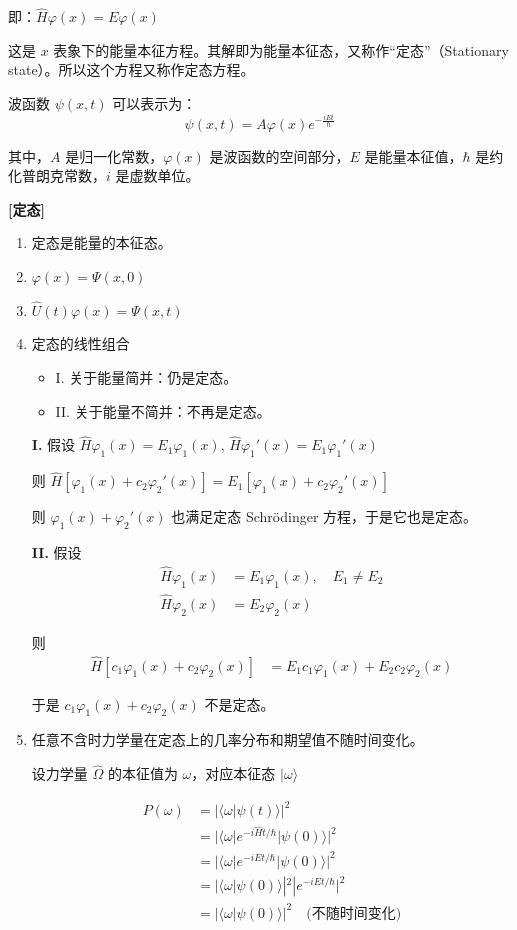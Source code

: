 \documentclass[lang=cn,15pt]{elegantbook}
\begin{document}
即：\(\hat{H} \varphi(x) = E \varphi(x)\)

这是 \(x\) 表象下的能量本征方程。其解即为能量本征态，又称作“定态”（Stationary state）。所以这个方程又称作定态方程。

波函数 \(\psi(x, t)\) 可以表示为：
\[ \psi(x, t) = A \varphi(x) e^{-\frac{iEt}{\hbar}} \]

其中，\(A\) 是归一化常数，\(\varphi(x)\) 是波函数的空间部分，\(E\) 是能量本征值，\(\hbar\) 是约化普朗克常数，\(i\) 是虚数单位。

\textbf{[定态]}
\begin{enumerate}
	\item 定态是能量的本征态。
	\item \(\varphi(x) = \Psi(x, 0)\)
	\item \(\hat{U}(t) \varphi(x) = \Psi(x, t)\)
	\item 定态的线性组合
	\begin{itemize}
		\item I. 关于能量简并：仍是定态。
		\item II. 关于能量不简并：不再是定态。
	\end{itemize}




\textbf{I.} 假设 \(\hat{H} \varphi_1(x) = E_1 \varphi_1(x)\), \(\hat{H} \varphi_1'(x) = E_1 \varphi_1'(x)\)

则 \(\hat{H} [\varphi_1(x) + c_2 \varphi_2'(x)] = E_1 [\varphi_1(x) + c_2 \varphi_2'(x)]\)

则 \(\varphi_1(x) + \varphi_2'(x)\) 也满足定态 Schrödinger 方程，于是它也是定态。

\textbf{II.} 假设
\begin{align*}
	\hat{H} \varphi_1(x) &= E_1 \varphi_1(x), \quad E_1 \neq E_2 \\
	\hat{H} \varphi_2(x) &= E_2 \varphi_2(x)
\end{align*}

则
\begin{align*}
	\hat{H} [c_1 \varphi_1(x) + c_2 \varphi_2(x)] &= E_1 c_1 \varphi_1(x) + E_2 c_2 \varphi_2(x)
\end{align*}

于是 \(c_1 \varphi_1(x) + c_2 \varphi_2(x)\) 不是定态。

	\item 任意不含时力学量在定态上的几率分布和期望值不随时间变化。
	
	设力学量 $\hat{\Omega}$ 的本征值为 $\omega$，对应本征态 $|\omega\rangle$
	
	\begin{align*}
		P(\omega) &= |\langle \omega | \psi(t) \rangle|^2 \\
		&= |\langle \omega | e^{-i\hat{H}t/\hbar} | \psi(0) \rangle|^2 \\
		&= |\langle \omega | e^{-iEt/\hbar} | \psi(0) \rangle|^2 \\
		&= |\langle \omega | \psi(0) \rangle|^2 |e^{-iEt/\hbar}|^2 \\
		&= |\langle \omega | \psi(0) \rangle|^2 \quad \text{(不随时间变化)}
	\end{align*}
	

\end{enumerate}
\end{document}
